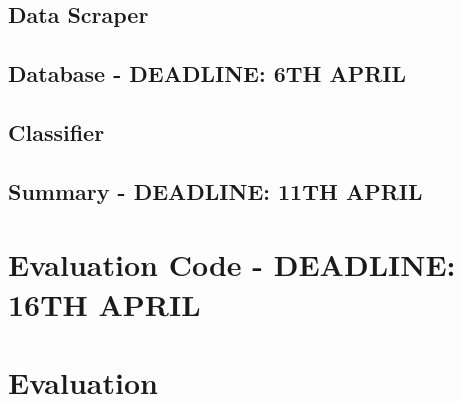 \documentclass[12pt,a4paper,twoside,openright]{report}
\begin{document}
\begin{comment}
Worth 40\%

This chapter should describe what was actually produced: the programs which were written, the hardware which was built or the theory which was developed. Any design strategies that looked ahead to the testing stage might profitably be referred to (the professional approach again).

Descriptions of programs may include fragments of high-level code but large chunks of code are usually best left to appendices or omitted altogether. Analogous advice applies to circuit diagrams.

Draw attention to the parts of the work which are not your own. Making effective use of powerful tools and pre-existing code is often laudable, and will count to your credit if properly reported.

It should not be necessary to give a day-by-day account of the progress of the work but major milestones may sometimes be highlighted with advantage.
\end{comment}
\section{Data Scraper}


\section{Database - DEADLINE: 6TH APRIL}


\section{Classifier} \label{implementation-classifier}


\section{Summary - DEADLINE: 11TH APRIL}


\chapter{Evaluation Code - DEADLINE: 16TH APRIL}
\chapter{Evaluation}
\end{document}
